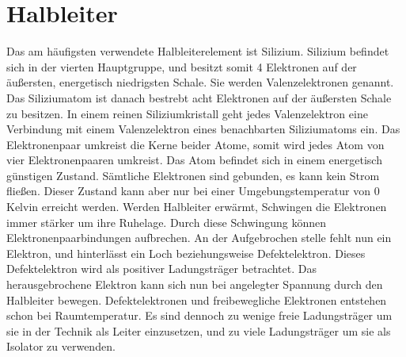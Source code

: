 \chapter{Halbleiter}
Das am häufigsten verwendete Halbleiterelement ist Silizium. Silizium befindet sich in der vierten Hauptgruppe, und besitzt somit 4 Elektronen auf der äußersten, energetisch niedrigsten Schale. Sie werden Valenzelektronen genannt. Das Siliziumatom ist danach bestrebt acht Elektronen auf der äußersten Schale zu besitzen. In einem reinen Siliziumkristall geht jedes Valenzelektron eine Verbindung mit einem Valenzelektron eines benachbarten Siliziumatoms ein. Das Elektronenpaar umkreist die Kerne beider Atome, somit wird jedes Atom von vier Elektronenpaaren umkreist. Das Atom befindet sich in einem energetisch günstigen Zustand. Sämtliche Elektronen sind gebunden, es kann kein Strom fließen.  Dieser Zustand kann aber nur bei einer Umgebungstemperatur von 0 Kelvin erreicht werden. Werden Halbleiter erwärmt, Schwingen die Elektronen immer stärker um ihre Ruhelage. Durch diese Schwingung können Elektronenpaarbindungen aufbrechen. An der Aufgebrochen stelle fehlt nun ein Elektron, und hinterlässt ein Loch beziehungsweise Defektelektron. Dieses Defektelektron wird als positiver Ladungsträger betrachtet.  Das herausgebrochene Elektron kann sich nun bei angelegter Spannung durch den Halbleiter bewegen. Defektelektronen und freibewegliche Elektronen entstehen schon bei Raumtemperatur. Es sind dennoch zu wenige freie Ladungsträger um sie in der Technik als Leiter einzusetzen, und zu viele Ladungsträger um sie als Isolator zu verwenden. 


